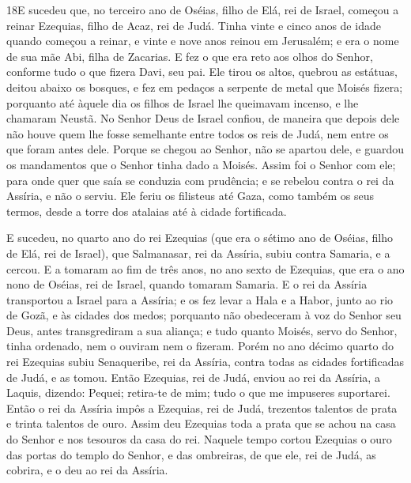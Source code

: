\medskip

\lettrine{18} E sucedeu que, no terceiro ano de Oséias, filho
de Elá, rei de Israel, começou a reinar Ezequias, filho de Acaz, rei
de Judá. Tinha vinte e cinco anos de idade quando começou a
reinar, e vinte e nove anos reinou em Jerusalém; e era o nome de sua
mãe Abi, filha de Zacarias. E fez o que era reto aos olhos do
Senhor, conforme tudo o que fizera Davi, seu pai. Ele tirou os
altos, quebrou as estátuas, deitou abaixo os bosques, e fez em
pedaços a serpente de metal que Moisés fizera; porquanto até àquele
dia os filhos de Israel lhe queimavam incenso, e lhe chamaram
Neustã. No Senhor Deus de Israel confiou, de maneira que depois
dele não houve quem lhe fosse semelhante entre todos os reis de
Judá, nem entre os que foram antes dele. Porque se chegou ao
Senhor, não se apartou dele, e guardou os mandamentos que o Senhor
tinha dado a Moisés. Assim foi o Senhor com ele; para onde quer
que saía se conduzia com prudência; e se rebelou contra o rei da
Assíria, e não o serviu. Ele feriu os filisteus até Gaza, como
também os seus termos, desde a torre dos atalaias até à cidade
fortificada.

E sucedeu, no quarto ano do rei Ezequias (que era o sétimo ano de
Oséias, filho de Elá, rei de Israel), que Salmanasar, rei da
Assíria, subiu contra Samaria, e a cercou. E a tomaram ao fim
de três anos, no ano sexto de Ezequias, que era o ano nono de
Oséias, rei de Israel, quando tomaram Samaria. E o rei da
Assíria transportou a Israel para a Assíria; e os fez levar a Hala e
a Habor, junto ao rio de Gozã, e às cidades dos medos;
porquanto não obedeceram à voz do Senhor seu Deus, antes
transgrediram a sua aliança; e tudo quanto Moisés, servo do Senhor,
tinha ordenado, nem o ouviram nem o fizeram. Porém no ano
décimo quarto do rei Ezequias subiu Senaqueribe, rei da Assíria,
contra todas as cidades fortificadas de Judá, e as tomou.
Então Ezequias, rei de Judá, enviou ao rei da Assíria, a
Laquis, dizendo: Pequei; retira-te de mim; tudo o que me impuseres
suportarei. Então o rei da Assíria impôs a Ezequias, rei de Judá,
trezentos talentos de prata e trinta talentos de ouro. Assim
deu Ezequias toda a prata que se achou na casa do Senhor e nos
tesouros da casa do rei. Naquele tempo cortou Ezequias o ouro
das portas do templo do Senhor, e das ombreiras, de que ele, rei de
Judá, as cobrira, e o deu ao rei da Assíria.

